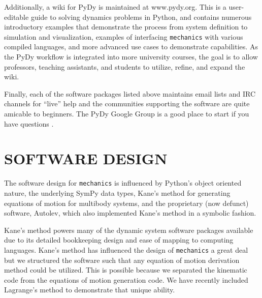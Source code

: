 \documentclass[twocolumn,10pt]{asme2e}
\begin{document}
Additionally, a wiki for PyDy is maintained at www.pydy.org. This is a
user-editable guide to solving dynamics problems in Python, and contains
numerous introductory examples that demonstrate the process from system
definition to simulation and visualization, examples of interfacing
\verb|mechanics| with various compiled languages, and more advanced use cases
to demonstrate capabilities. As the PyDy workflow is integrated into more
university courses, the goal is to allow professors, teaching assistants, and
students to utilize, refine, and expand the wiki.

Finally, each of the software packages listed above maintains email lists and
IRC channels for ``live'' help and the communities supporting the software are
quite amicable to beginners. The PyDy Google Group is a good place to start if
you have questions \cite{PyDyGoogleGroup}.
%
\section*{SOFTWARE DESIGN}
The software design for \verb|mechanics| is influenced by Python's object
oriented nature, the underlying SymPy data types, Kane’s method for generating
equations of motion\cite{Kane1985} for multibody systems, and the proprietary
(now defunct) software, Autolev\cite{Kane2000}, which also implemented Kane's
method in a symbolic fashion.

Kane’s method powers many of the dynamic system software packages available
\cite{Sayers1990, Englighten2013} due to its detailed bookkeeping design and
ease of mapping to computing languages. Kane’s method  has influenced the
design of \verb|mechanics| a great deal but we structured the software such
that any equation of motion derivation method could be utilized. This is
possible because we separated the kinematic code from the equations of motion
generation code. We have recently included Lagrange’s method to demonstrate
that unique ability.
\end{document}
